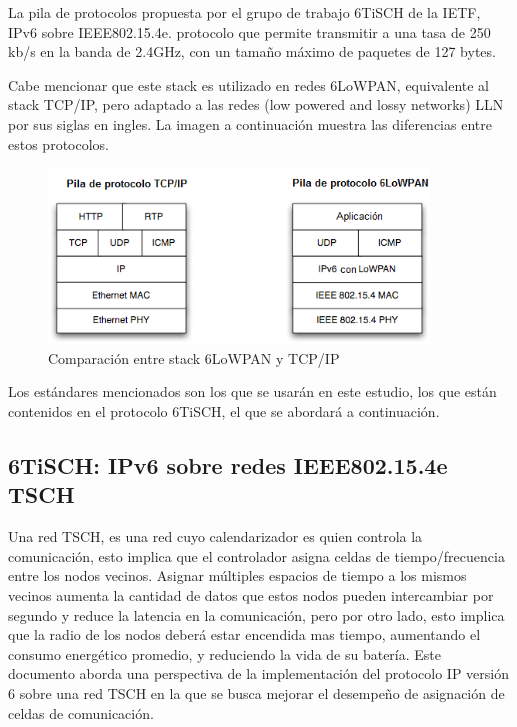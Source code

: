 La pila de protocolos propuesta por el grupo de trabajo 6TiSCH de la IETF, IPv6 sobre IEEE802.15.4e. protocolo que permite transmitir a una tasa de 250 kb/s en la banda de 2.4GHz, con un tamaño máximo de paquetes de 127 bytes. 

Cabe mencionar que este stack es utilizado en redes 6LoWPAN, equivalente al stack TCP/IP, pero adaptado a las redes (low powered and lossy networks) LLN por sus siglas en ingles. La imagen a continuación muestra las diferencias entre estos protocolos.

\begin{figure}[h]
\centering
\graphicspath{ {imagenes/} }
\includegraphics[width=0.9\textwidth]{stack.png}
\caption{Comparación entre stack 6LoWPAN y TCP/IP}
\label{stack}
\end{figure}

Los estándares mencionados son los que se usarán en este estudio, los que están contenidos en el protocolo 6TiSCH, el que se abordará a continuación.




\subsection{6TiSCH: IPv6 sobre redes IEEE802.15.4e TSCH}


Una red TSCH, es una red cuyo calendarizador es quien controla la comunicación, esto implica que el controlador asigna celdas de tiempo/frecuencia entre los nodos vecinos. Asignar múltiples espacios de tiempo a los mismos vecinos aumenta la cantidad de datos que estos nodos pueden intercambiar por segundo y reduce la latencia en la comunicación, pero por otro lado, esto implica que la radio de los nodos deberá estar encendida mas tiempo, aumentando el consumo energético promedio, y reduciendo la vida de su batería. Este documento aborda una perspectiva de la implementación del protocolo IP versión 6 sobre una red TSCH en la que se busca mejorar el desempeño de asignación de celdas de comunicación.


